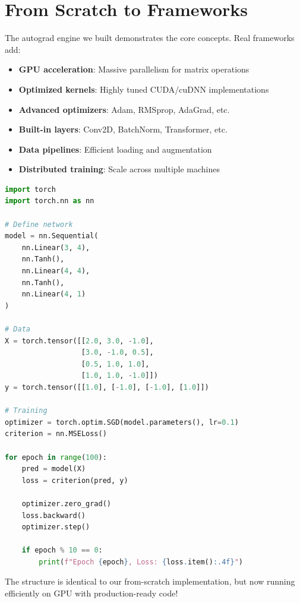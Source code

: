 \section{From Scratch to Frameworks}

The autograd engine we built demonstrates the core concepts. Real frameworks add:

\begin{itemize}
    \item \textbf{GPU acceleration}: Massive parallelism for matrix operations
    \item \textbf{Optimized kernels}: Highly tuned CUDA/cuDNN implementations
    \item \textbf{Advanced optimizers}: Adam, RMSprop, AdaGrad, etc.
    \item \textbf{Built-in layers}: Conv2D, BatchNorm, Transformer, etc.
    \item \textbf{Data pipelines}: Efficient loading and augmentation
    \item \textbf{Distributed training}: Scale across multiple machines
\end{itemize}

\begin{lstlisting}[language=Python, caption={Same Network in PyTorch}]
import torch
import torch.nn as nn

# Define network
model = nn.Sequential(
    nn.Linear(3, 4),
    nn.Tanh(),
    nn.Linear(4, 4),
    nn.Tanh(),
    nn.Linear(4, 1)
)

# Data
X = torch.tensor([[2.0, 3.0, -1.0],
                  [3.0, -1.0, 0.5],
                  [0.5, 1.0, 1.0],
                  [1.0, 1.0, -1.0]])
y = torch.tensor([[1.0], [-1.0], [-1.0], [1.0]])

# Training
optimizer = torch.optim.SGD(model.parameters(), lr=0.1)
criterion = nn.MSELoss()

for epoch in range(100):
    pred = model(X)
    loss = criterion(pred, y)
    
    optimizer.zero_grad()
    loss.backward()
    optimizer.step()
    
    if epoch % 10 == 0:
        print(f"Epoch {epoch}, Loss: {loss.item():.4f}")
\end{lstlisting}

The structure is identical to our from-scratch implementation, but now running efficiently on GPU with production-ready code!

